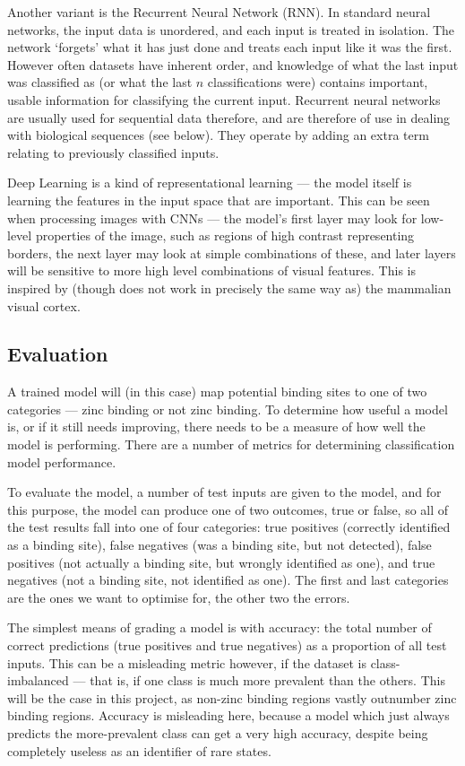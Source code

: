 Another variant is the Recurrent Neural Network (RNN). In standard neural networks, the input data is unordered, and each input is treated in isolation. The network `forgets' what it has just done and treats each input like it was the first. However often datasets have inherent order, and knowledge of what the last input was classified as (or what the last $n$ classifications were) contains important, usable information for classifying the current input. Recurrent neural networks are usually used for sequential data therefore, and are therefore of use in dealing with biological sequences (see below). They operate by adding an extra term relating to previously classified inputs.

Deep Learning is a kind of representational learning --- the model itself is learning the features in the input space that are important. This can be seen when processing images with CNNs --- the model's first layer may look for low-level properties of the image, such as regions of high contrast representing borders, the next layer may look at simple combinations of these, and later layers will be sensitive to more high level combinations of visual features. This is inspired by (though does not work in precisely the same way as) the mammalian visual cortex.

\subsection{Evaluation}

A trained model will (in this case) map potential binding sites to one of two categories --- zinc binding or not zinc binding. To determine how useful a model is, or if it still needs improving, there needs to be a measure of how well the model is performing. There are a number of metrics for determining classification model performance.

To evaluate the model, a number of test inputs are given to the model, and for this purpose, the model can produce one of two outcomes, true or false, so all of the test results fall into one of four categories: true positives (correctly identified as a binding site), false negatives (was a binding site, but not detected), false positives (not actually a binding site, but wrongly identified as one), and true negatives (not a binding site, not identified as one). The first and last categories are the ones we want to optimise for, the other two the errors.

The simplest means of grading a model is with accuracy: the total number of correct predictions (true positives and true negatives) as a proportion of all test inputs. This can be a misleading metric however, if the dataset is class-imbalanced --- that is, if one class is much more prevalent than the others. This will be the case in this project, as non-zinc binding regions vastly outnumber zinc binding regions. Accuracy is misleading here, because a model which just always predicts the more-prevalent class can get a very high accuracy, despite being completely useless as an identifier of rare states.

